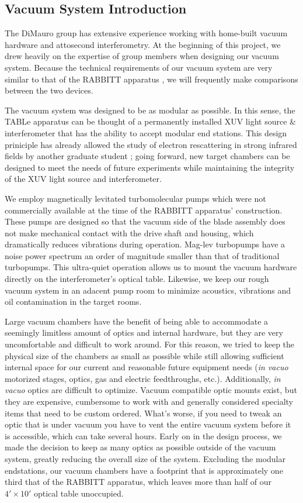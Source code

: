 \subsection{Vacuum System Introduction}

The DiMauro group has extensive experience working with home-built vacuum hardware and attosecond interferometry. At the beginning of this project, we drew heavily on the expertise of group members when designing our vacuum system. Because the technical requirements of our vacuum system are very similar to that of the RABBITT apparatus \cite{chirlaAttosecondPulseGeneration2011}, we will frequently make comparisons between the two devices.

The vacuum system was designed to be as modular as possible. In this sense, the TABLe apparatus can be thought of a permanently installed XUV light source \& interferometer that has the ability to accept modular end stations. This design priniciple has already allowed the study of electron rescattering in strong infrared fields by another graduate student \cite{kiesewetterDynamicsNearThresholdAttosecond2019}; going forward, new target chambers can be designed to meet the needs of future experiments while maintaining the integrity of the XUV light source and interferometer.

We employ magnetically levitated turbomolecular pumps which were not commercially available at the time of the RABBITT apparatus' construction. These pumps are designed so that the vacuum side of the blade assembly does not make mechanical contact with the drive shaft and housing, which dramatically reduces vibrations during operation. Mag-lev turbopumps have a noise power spectrum an order of magnitude smaller than that of traditional turbopumps. This ultra-quiet operation allows us to mount the vacuum hardware directly on the interferometer's optical table. Likewise, we keep our rough vacuum system in an adacent pump room to minimize acoustics, vibrations and oil contamination in the target rooms.

Large vacuum chambers have the benefit of being able to accommodate a seemingly limitless amount of optics and internal hardware, but they are very uncomfortable and difficult to work around. For this reason, we tried to keep the physical size of the chambers as small as possible while still allowing sufficient internal space for our current and reasonable future equipment needs (\textit{in vacuo} motorized stages, optics, gas and electric feedthroughs, etc.). Additionally, \textit{in vacuo} optics are difficult to optimize. Vacuum compatible optic mounts exist, but they are expensive, cumbersome to work with and generally considered specialty items that need to be custom ordered. What's worse, if you need to tweak an optic that is under vacuum you have to vent the entire vacuum system before it is accessible, which can take several hours. Early on in the design process, we made the decision to keep as many optics as possible outside of the vacuum system, greatly reducing the overall size of the system. Excluding the modular endstations, our vacuum chambers have a footprint that is approximately one third that of the RABBITT apparatus, which leaves more than half of our $4' \times 10'$ optical table unoccupied.

